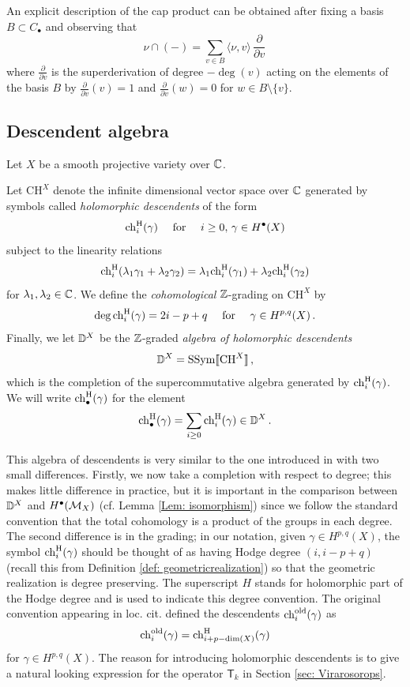 \documentclass[a4paper, 12pt]{amsart}
\begin{document}
An explicit description of the cap product can be obtained after fixing a basis $B\subset C_\bullet$ and observing that 
$$
\nu \cap (-) = \sum_{v\in B}\langle \nu,v\rangle\, \frac{\partial}{\partial v}\,
$$
where $\frac{\partial}{\partial v}$ is the superderivation of degree $-\deg(v)$ acting on the elements of the basis $B$ by $\frac{\partial}{\partial v}(v)=1$ and $\frac{\partial}{\partial v}(w)=0$ for $w\in B\setminus \{v\}$.

\subsection{Descendent algebra}
\label{sec: descendentalgebra}
Let $X$ be a smooth projective variety over ${\mathbb{C}}$.

\begin{definition}\label{def: descendentalgebra}
Let $\text{CH}^X$ denote the infinite dimensional vector space over ${\mathbb{C}}$  generated by symbols called \textit{holomorphic descendents} of the form
\[\mathrm{ch}^{\mathrm{H}}_i(\gamma)\quad\textup{ for }\quad i\geq 0,\, \gamma\in H^\bullet(X)\]
subject to the linearity relations
\[\mathrm{ch}^{\mathrm{H}}_i(\lambda_1\gamma_1+\lambda_2\gamma_2)=\lambda_1\mathrm{ch}^{\mathrm{H}}_i(\gamma_1)+\lambda_2\mathrm{ch}^{\mathrm{H}}_i(\gamma_2)\]
for $\lambda_1, \lambda_2\in {\mathbb{C}}$. We define the \textit{cohomological} ${\mathbb{Z}}$-grading on $\text{CH}^X$ by 
\begin{equation}
\label{eq: degchigamma}
\deg\mathrm{ch}^{\mathrm{H}}_i(\gamma) = 2i-p+q \quad \text{ for }\quad \gamma\in H^{p,q}(X)\,.
\end{equation}
Finally, we let ${\mathbb{D}}^X$ be the ${\mathbb{Z}}$-graded \textit{algebra of holomorphic descendents}
\[{\mathbb{D}}^X = \text{SSym}\llbracket\text{CH}^X\rrbracket\,,\]
which is the completion of the supercommutative algebra generated by $\mathrm{ch}_i^{\mathrm{H}}(\gamma)$. We will write $\mathrm{ch}^{\mathrm{H}}_\bullet(\gamma)$ for the element
\[\mathrm{ch}^{\mathrm{H}}_\bullet(\gamma)=\sum_{i\geq 0}\mathrm{ch}^{\mathrm{H}}_i(\gamma)\in {\mathbb{D}}^X\,.\]
\end{definition}

\begin{remark}\label{rem: comparingnotation}
This algebra of descendents is very similar to the one introduced in \cite{moop} with two small differences. Firstly, we now take a completion with respect to degree; this makes little difference in practice, but it is important in the comparison between ${\mathbb{D}}^X$ and $H^\bullet({\mathcal M}_X)$ (cf. Lemma \ref{Lem: isomorphism}) since we follow the standard convention that the total cohomology is a product of the groups in each degree. The second difference is in the grading; in our notation, given $\gamma\in H^{p,q}(X)$, the symbol $\mathrm{ch}^{\mathrm{H}}_i(\gamma)$ should be thought of as having Hodge degree $(i, i-p+q)$ (recall this from Definition \ref{def: geometricrealization}) so that the geometric realization is degree preserving. The superscript $H$ stands for holomorphic part of the Hodge degree and is used to indicate this degree convention. The original convention appearing in loc. cit. defined the descendents $\mathrm{ch}^{\text{old}}_i(\gamma)$ as \[\mathrm{ch}_i^{\textup{old}}(\gamma)=\mathrm{ch}^{\mathrm{H}}_{i+p-\dim(X)}(\gamma)\]
for $\gamma\in H^{p,q}(X)$. The reason for introducing holomorphic descendents is to give a natural looking expression for the operator $\mathsf{T}_k$ in Section \ref{sec: Virarosorops}.
\end{remark}
\end{document}
